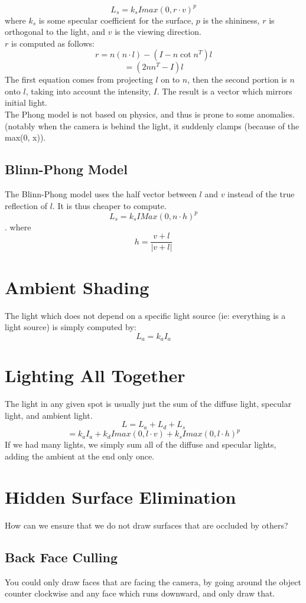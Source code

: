 \documentclass[12pt]{article}
\theoremstyle{definition}
\begin{document}
$$L_s = k_sImax(0, r\cdot v)^p$$
where $k_s$ is some specular coefficient for the surface, $p$ is the shininess, $r$ is orthogonal to the light, and $v$ is the viewing direction.
\\ \linebreak
$r$ is computed as follows:
$$r = n(n\cdot l) - (I - n\cot n^T)l$$
$$ = (2nn^T - I)l$$
The first equation comes from projecting $l$ on to $n$, then the second portion is $n$ onto $l$, taking into account the intensity, $I$. The result is a vector which mirrors initial light.
\\ \linebreak
The Phong model is not based on physics, and thus is prone to some anomalies. (notably when the camera is behind the light, it suddenly clamps (because of the max(0, x)).

\subsection{Blinn-Phong Model}
The Blinn-Phong model uses the half vector between $l$ and $v$ instead of the true reflection of $l$. It is thus cheaper to compute.
$$L_s = k_sIMax(0, n\cdot h)^p$$. where $$h= \frac{v + l}{|v+l|}$$

\section{Ambient Shading}
The light which does not depend on a specific light source (ie: everything is a light source) is simply computed by:
$$ L_a = k_aI_a$$ 

\section{Lighting All Together}
The light in any given spot is usually just the sum of the diffuse light, specular light, and ambient light. 
$$L = L_a + L_d + L_s$$
$$ = k_aI_a + k_dImax(0, l\cdot v) + k_sImax(0, l\cdot h)^p$$
If we had many lights, we simply sum all of the diffuse and specular lights, adding the ambient at the end only once.
\\ \linebreak

\section{Hidden Surface Elimination}
How can we ensure that we do not draw surfaces that are occluded by others?
\subsection{Back Face Culling}
You could only draw faces that are facing the camera, by going around the object counter clockwise and any face which runs downward, and only draw that. 
\\ \linebreak
\end{document}
